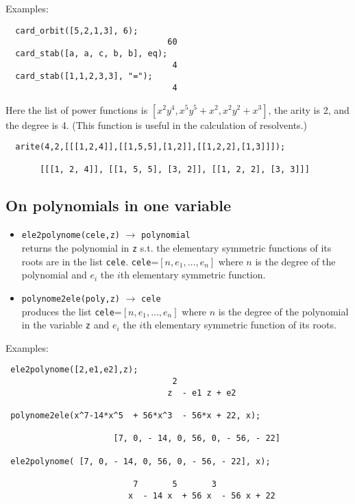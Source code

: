 \documentclass[11pt]{article}
\begin{document}
Examples:
\small
\begin{verbatim}
  card_orbit([5,2,1,3], 6);
                                 60
  card_stab([a, a, c, b, b], eq);
                                  4
  card_stab([1,1,2,3,3], "=");
                                  4
\end{verbatim}
Here the list of power functions is $[x^2y^4,x^5y^5 + x^2,x^2y^2+x^3]$, the
arity is 2, and the degree is 4. (This function is useful in the calculation of
resolvents.)
\begin{verbatim}
  arite(4,2,[[[1,2,4]],[[1,5,5],[1,2]],[[1,2,2],[1,3]]]);

       [[[1, 2, 4]], [[1, 5, 5], [3, 2]], [[1, 2, 2], [3, 3]]]
\end{verbatim}
\normalsize


\subsection{On polynomials in one variable}

\begin{itemize}
  \item \texttt{ele2polynome(cele,z)} 
    $\longrightarrow$ \texttt{polynomial} \\
    returns the polynomial in \texttt{z} s.t. the elementary symmetric functions of
    its roots are in the list \texttt{cele}.  \texttt{cele}=$[n,e_1,\dots,e_n]$
    where $n$ is the degree of the polynomial and $e_i$ the $i$th elementary
    symmetric function.
  \item \texttt{polynome2ele(poly,z)} 
    $\longrightarrow$ \texttt{cele} \\
    produces the list \texttt{cele}=$[n,e_1,\dots,e_n]$ where $n$ is the degree
    of the polynomial in the variable \texttt{z} and $e_i$ the $i$th elementary
    symmetric function of its roots.
\end{itemize}
Examples:
\small
\begin{verbatim}
 ele2polynome([2,e1,e2],z);
                                  2
                                 z  - e1 z + e2

 polynome2ele(x^7-14*x^5  + 56*x^3  - 56*x + 22, x);
 
                      [7, 0, - 14, 0, 56, 0, - 56, - 22]

 ele2polynome( [7, 0, - 14, 0, 56, 0, - 56, - 22], x);

                          7       5       3
                         x  - 14 x  + 56 x  - 56 x + 22
\end{verbatim}
\normalsize
\end{document}
